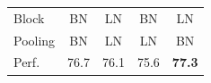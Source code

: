 \begin{tabular}{l|cccc}\toprule
Block &BN &LN &BN &\cellcolor[HTML]{efefef}LN \\
Pooling &BN &LN &LN &\cellcolor[HTML]{efefef}BN \\\midrule
Perf. &76.7 &76.1 &75.6 &\cellcolor[HTML]{efefef}\textbf{77.3} \\
\bottomrule
\end{tabular}